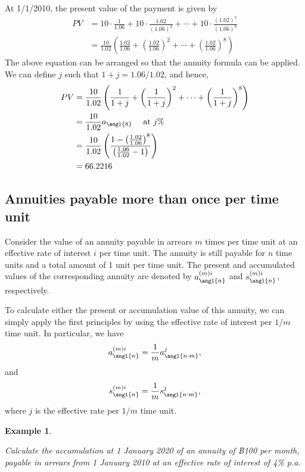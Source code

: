 \documentclass[
]{book}
\theoremstyle{definition}
\theoremstyle{definition}
\newtheorem{example}{Example}[chapter]
\theoremstyle{definition}
\theoremstyle{definition}
\theoremstyle{remark}
\begin{document}
At 1/1/2010, the present value of the payment is given by
\[\begin{aligned}
    PV &= 10 \cdot \frac{1}{1.06} + 10 \cdot \frac{1.02}{(1.06)^2} + \cdots +  10 \cdot \frac{(1.02)^7}{(1.06)^8} \\
        &= \frac{10}{1.02} \left(  \frac{1.02}{1.06} +  \left(  \frac{1.02}{1.06}  \right)^2 + \cdots +
    \left(  \frac{1.02}{1.06}  \right)^8  \right)\end{aligned}\] The
above equation can be arranged so that the annuity formula can be
applied. We can define \(j\) such that \(1 + j = 1.06/1.02\), and hence,
\[\begin{aligned}
    PV &= \frac{10}{1.02} \left(  \frac{1}{1 + j} +  \left(  \frac{1}{1+j}  \right)^2 + \cdots +
    \left(  \frac{1}{1+j}  \right)^8  \right)  \\
    &=   \frac{10}{1.02}  a_\angl{8} \quad  \text{ at } j\% \\
    &=  \frac{10}{1.02} \left(   \frac{1 - \left(\frac{1.02}{1.06}\right)^8   }{\left(   \frac{1.06}{1.02}   - 1 \right)}  \right) \\
    &= 66.2216\end{aligned}\]

\hypertarget{annuities-payable-more-than-once-per-time-unit}{%
\subsection{Annuities payable more than once per time unit}\label{annuities-payable-more-than-once-per-time-unit}}

Consider the value of an annuity payable in arrears \(m\) times per time
unit at an effective rate of interest \(i\) per time unit. The annuity is
still payable for \(n\) time units and a total amount of 1 unit per time
unit. The present and accumulated values of the corresponding annuity
are denoted by \(a^{(m)i}_\angl{n}\) and \(s^{(m)i}_\angl{n}\),
respectively.

To calculate either the present or accumulation value of this annuity,
we can simply apply the first principles by using the effective rate of
interest per \(1/m\) time unit. In particular, we have
\[a^{(m)i}_\angl{n}   = \frac{1}{m}  a^j_\angl{n\cdot m},\] and
\[s^{(m)i}_\angl{n}   = \frac{1}{m}  s^j_\angl{n\cdot m},\] where \(j\) is
the effective rate per \(1/m\) time unit.

\begin{example}
\protect\hypertarget{exm:unlabeled-div-37}{}\label{exm:unlabeled-div-37}

\emph{Calculate the accumulation at 1 January 2020 of an annuity of ฿100 per
month, payable in arrears from 1 January 2010 at an effective rate of
interest of 4\% p.a.}

\end{example}
\end{document}
